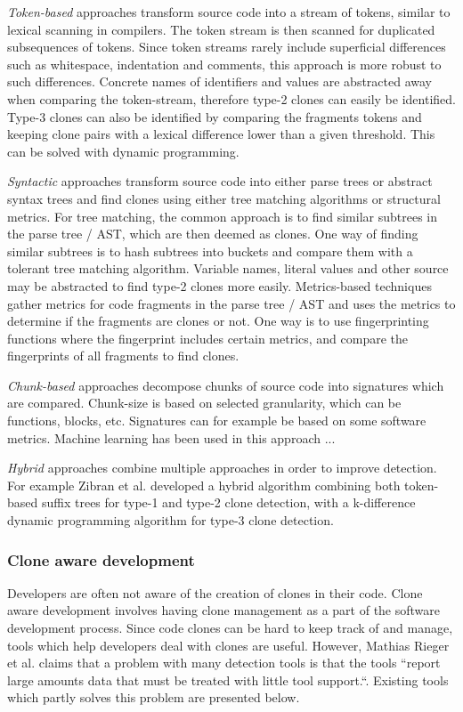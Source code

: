 \documentclass[12pt]{article}
\begin{document}
\textit{Token-based} approaches transform source code into a stream of tokens, similar to
lexical scanning in compilers. The token stream is then scanned for duplicated
subsequences of tokens. Since token streams rarely include superficial differences
such as whitespace, indentation and comments, this approach is more robust to such
differences. Concrete names of identifiers and values are abstracted away when comparing
the token-stream, therefore type-2 clones can easily be identified. Type-3 clones can also
be identified by comparing the fragments tokens and keeping clone pairs with a lexical
difference lower than a given threshold. This can be solved with dynamic
programming\cite{BakerSparseDynamicProgramming}.

\textit{Syntactic} approaches transform source code into either parse trees or abstract
syntax trees and find clones using either tree matching algorithms or structural metrics.
For tree matching, the common approach is to find similar subtrees in the parse tree /
AST, which are then deemed as clones. One way of finding similar subtrees is to hash
subtrees into buckets and compare them with a tolerant tree matching algorithm. Variable
names, literal values and other source may be abstracted to find type-2 clones more
easily. Metrics-based techniques gather metrics for code fragments in the parse tree / AST
and uses the metrics to determine if the fragments are clones or not. One way is to use
fingerprinting functions where the fingerprint includes certain metrics, and compare the
fingerprints of all fragments to find clones.

\textit{Chunk-based} approaches decompose chunks of source code into signatures which are
compared. Chunk-size is based on selected granularity, which can be functions, blocks,
etc. Signatures can for example be based on some software metrics. Machine learning has
been used in this approach ...

\textit{Hybrid} approaches combine multiple approaches in order to improve detection. For
example Zibran et al.\cite{Zibran_real_time_search} developed a hybrid algorithm
combining both token-based suffix trees for type-1 and type-2 clone detection, with
a k-difference dynamic programming algorithm for type-3 clone detection.


\subsubsection{Clone aware development}

Developers are often not aware of the creation of clones in their code. Clone aware
development involves having clone management as a part of the software development
process. Since code clones can be hard to keep track of and manage, tools which help
developers deal with clones are useful. However, Mathias Rieger et al. claims that
a problem with many detection tools is that the tools ``report large amounts data that must
be treated with little tool support.``\cite[1]{InsightsSystemWideDuplication}. Existing
tools which partly solves this problem are presented below.
\end{document}
